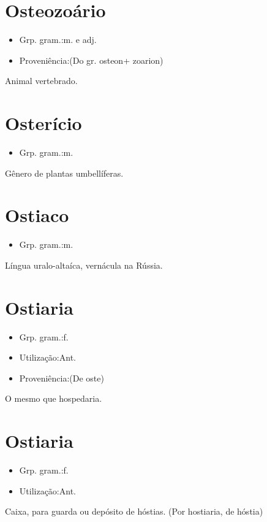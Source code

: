 \section{Osteozoário}
\begin{itemize}
\item {Grp. gram.:m.  e  adj.}
\end{itemize}
\begin{itemize}
\item {Proveniência:(Do gr. \textunderscore osteon\textunderscore  + \textunderscore zoarion\textunderscore )}
\end{itemize}
Animal vertebrado.
\section{Osterício}
\begin{itemize}
\item {Grp. gram.:m.}
\end{itemize}
Gênero de plantas umbellíferas.
\section{Ostiaco}
\begin{itemize}
\item {Grp. gram.:m.}
\end{itemize}
Língua uralo-altaíca, vernácula na Rússia.
\section{Ostiaria}
\begin{itemize}
\item {Grp. gram.:f.}
\end{itemize}
\begin{itemize}
\item {Utilização:Ant.}
\end{itemize}
\begin{itemize}
\item {Proveniência:(De \textunderscore oste\textunderscore )}
\end{itemize}
O mesmo que \textunderscore hospedaria\textunderscore .
\section{Ostiaria}
\begin{itemize}
\item {Grp. gram.:f.}
\end{itemize}
\begin{itemize}
\item {Utilização:Ant.}
\end{itemize}
Caixa, para guarda ou depósito de hóstias.
(Por \textunderscore hostiaria\textunderscore , de \textunderscore hóstia\textunderscore )
